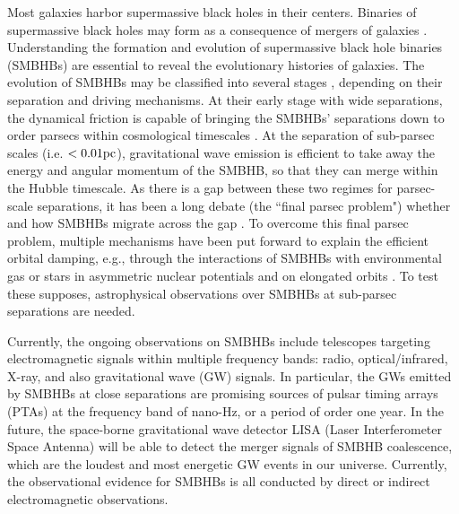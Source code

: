 \documentclass[twocolumn]{aastex62}
\begin{document}
Most galaxies harbor supermassive black holes in their centers. Binaries of supermassive black holes may form as a consequence of mergers of galaxies \citep{KormendyRichstone1995, Kauffmann2000, Volonteri2003, Ferrarese2005, KormendyHo2013, ColpiDotti2011}. Understanding the formation and evolution of supermassive black hole binaries (SMBHBs) are  essential to reveal the evolutionary histories of galaxies. 
The evolution of SMBHBs may be classified into several stages \citep{Begelman1980Nature}, depending on their separation and driving mechanisms. At their early stage with wide separations, the dynamical friction is capable of bringing the SMBHBs' separations down to order parsecs within cosmological timescales \citep[see, e.g., ][]{Callegari2011, Mayer2013, Dosopoulou2017}. At the separation of sub-parsec scales  (i.e. $< 0.01{\rm pc}$), gravitational wave emission is efficient to take away the energy and angular momentum of the SMBHB, so that they can merge within the Hubble timescale. As there is a gap between these two regimes for parsec-scale separations, it has been a long debate (the ``final parsec problem") whether and how SMBHBs migrate across the gap \citep{Begelman1980Nature, Colpi2014}. To overcome this final parsec problem, multiple mechanisms have been put forward to explain the efficient orbital damping, e.g., through the  interactions of SMBHBs with environmental  gas or stars in asymmetric nuclear potentials and on elongated orbits \citep[e.g., see the review by][]{Colpi2014}. To test these supposes, astrophysical observations over SMBHBs at sub-parsec separations are needed. 

Currently, the ongoing observations on SMBHBs include telescopes targeting electromagnetic signals within multiple frequency bands: radio, optical/infrared, X-ray, and also gravitational wave (GW) signals. In particular, the GWs emitted by SMBHBs at close separations are promising sources of pulsar timing arrays (PTAs) \citep{McLaughlin2013, Hobbs2013, PTA2016, PTA2020} at the frequency band of nano-Hz, or a period of order one year. In the future, the space-borne gravitational wave detector  LISA (Laser Interferometer Space Antenna) \citep{Amaro_etal2017} will be able to detect the merger signals of SMBHB coalescence, which  are the loudest and most energetic GW events in our universe. Currently, the observational evidence for SMBHBs is all conducted by direct or indirect electromagnetic observations. 
\end{document}
